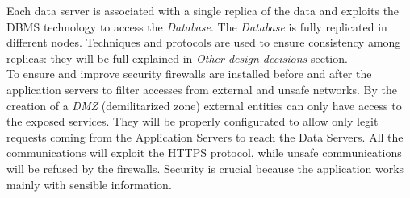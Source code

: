 \documentclass[a4paper]{report}
\begin{document}
Each data server is associated with a single replica of the data and exploits the DBMS technology to access the \textit{Database}. The \textit{Database} is fully replicated in different nodes. Techniques and protocols are used to ensure consistency among replicas: they will be full explained in \textit{Other design decisions} section.\\
To ensure and improve security firewalls are installed before and after the application servers to filter accesses from external and unsafe networks. By the creation of a \textit{DMZ} (demilitarized zone) external entities can only have access to the exposed services. They will be properly configurated to allow only legit requests coming from the Application Servers to reach the Data Servers. All the communications will exploit the HTTPS protocol, while unsafe communications will be refused by the firewalls. Security is crucial because the application works mainly with sensible information. 
\end{document}
